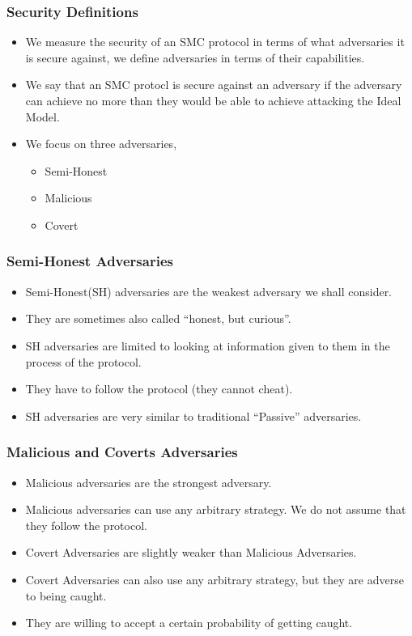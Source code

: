 \documentclass{beamer}
\begin{document}
	\begin{frame}
		\frametitle{Security Definitions}
		
		\begin{itemize}

		\item We measure the security of an SMC protocol in terms of what adversaries it is secure against, we define adversaries in terms of their capabilities.

		\item We say that an SMC protocl is secure against an adversary if the adversary can achieve no more than they would be able to achieve attacking the Ideal Model.

		\item We focus on three adversaries,
			\begin{itemize}
			\item Semi-Honest 
			\item Malicious 
			\item Covert
			\end{itemize}
		\end{itemize}
	\end{frame}


	\begin{frame}
		\frametitle{Semi-Honest Adversaries}
		\begin{itemize}
			\item Semi-Honest(SH) adversaries are the weakest adversary we shall consider.
			\item They are sometimes also called ``honest, but curious''.
			\item SH adversaries are limited to looking at information given to them in the process of the protocol.
			\item They have to follow the protocol (they cannot cheat). 
			\item SH adversaries are very similar to traditional ``Passive'' adversaries.
		\end{itemize}
	\end{frame}


	\begin{frame}
		\frametitle{Malicious and Coverts Adversaries}
		\begin{itemize}
			\item Malicious adversaries are the strongest adversary.
			\item Malicious adversaries can use any arbitrary strategy. We do not assume that they follow the protocol.
			\bigskip
			\item Covert Adversaries are slightly weaker than Malicious Adversaries.
			\item Covert Adversaries can also use any arbitrary strategy, but they are adverse to being caught.
			\item They are willing to accept a certain probability of getting caught.
		\end{itemize}
	\end{frame}
\end{document}
